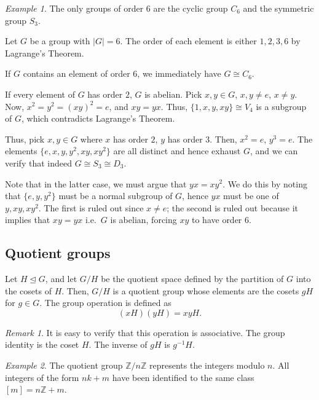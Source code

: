 \documentclass[11pt]{article}
\newcommand{\Z}{\mathbb{Z}}
\theoremstyle{definition}
\theoremstyle{remark}
\newtheorem*{remark}{Remark}
\newtheorem*{example}{Example}
\numberwithin{equation}{section}
\begin{document}
    \begin{example}
        The only groups of order $6$ are the cyclic group $C_6$ and the symmetric
        group $S_3$.
        
        Let $G$ be a group with $|G| = 6$. The order of each element is either $1, 2,
        3, 6$ by Lagrange's Theorem.

        If $G$ contains an element of order $6$, we immediately have $G\cong C_6$.

        If every element of $G$ has order $2$, $G$ is abelian. Pick $x, y \in G$, $x,
        y \neq e$, $x \neq y$. Now, $x^2 = y^2 = (xy)^2 = e$, and $xy = yx$. Thus,
        $\{1, x, y, xy\} \cong V_4$ is a subgroup of $G$, which contradicts
        Lagrange's Theorem.

        Thus, pick $x, y \in G$ where $x$ has order $2$, $y$ has order $3$. Then,
        $x^2 = e$, $y^3 = e$. The elements $\{e, x, y, y^2, xy, xy^2\}$ are all
        distinct and hence exhaust $G$, and we can verify that indeed $G \cong S_3
        \cong D_3$.

        Note that in the latter case, we must argue that $yx = xy^2$. We do this by
        noting that $\{e, y, y^2\}$ must be a normal subgroup of $G$, hence $yx$ must
        be one of $y, xy, xy^2$. The first is ruled out since $x \neq e$; the second
        is ruled out because it implies that $xy = yx$ i.e.\ $G$ is abelian, forcing
        $xy$ to have order $6$.
    \end{example}

    \subsection{Quotient groups}
    \begin{definition}
        Let $H \trianglelefteq G$, and let $G/H$ be the quotient space defined by the
        partition of $G$ into the cosets of $H$. Then, $G/H$ is a quotient group
        whose elements are the cosets $gH$ for $g \in G$. The group operation is
        defined as \[
            (xH)(yH) = xyH.
        \] 
        \begin{remark}
            It is easy to verify that this operation is associative. The group
            identity is the coset $H$. The inverse of $gH$ is $g^{-1}H$.
        \end{remark}
    \end{definition}
    \begin{example}
        The quotient group $\Z/n\Z$ represents the integers modulo $n$. All integers
        of the form $nk + m$ have been identified to the same class $[m] = n\Z + m$.
    \end{example}
\end{document}

